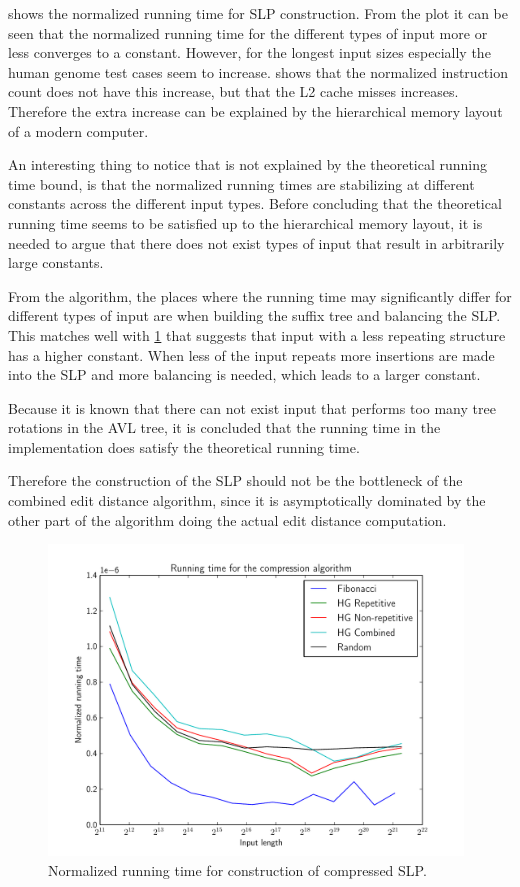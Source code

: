 \documentclass[twoside,11pt,openright]{report}
\begin{document}
 shows the normalized running time for SLP construction. From the plot it can be seen that the normalized running time for the different types of input more or less converges to a constant. However, for the longest input sizes especially the human genome test cases seem to increase.  shows that the normalized instruction count does not have this increase, but that the L2 cache misses increases. Therefore the extra increase can be explained by the hierarchical memory layout of a modern computer.

An interesting thing to notice that is not explained by the theoretical running time bound, is that the normalized running times are stabilizing at different constants across the different input types. Before concluding that the theoretical running time seems to be satisfied up to the hierarchical memory layout, it is needed to argue that there does not exist types of input that result in arbitrarily large constants.

From the algorithm, the places where the running time may significantly differ for different types of input are when building the suffix tree and balancing the SLP. This matches well with \cref{fig:compression:runningtime} that suggests that input with a less repeating structure has a higher constant. When less of the input repeats more insertions are made into the SLP and more balancing is needed, which leads to a larger constant.

Because it is known that there can not exist input that performs too many tree rotations in the AVL tree, it is concluded that the running time in the implementation does satisfy the theoretical running time.

Therefore the construction of the SLP should not be the bottleneck of the combined edit distance algorithm, since it is asymptotically dominated by the other part of the algorithm doing the actual edit distance computation.
%
\begin{figure}[!htb]
  \centering
  \includegraphics[width=11cm]{compression/runningtime}
  \caption{Normalized running time for construction of compressed SLP.}
  \label{fig:compression:runningtime}
\end{figure}
\end{document}
